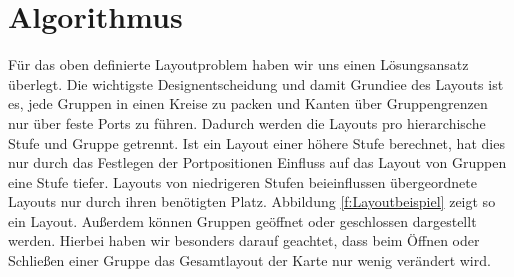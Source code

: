 \chapter{Algorithmus} %



Für das oben definierte Layoutproblem haben wir uns einen Lösungsansatz überlegt.
Die wichtigste Designentscheidung und damit Grundiee des Layouts ist es, jede Gruppen in einen Kreise zu packen und Kanten über Gruppengrenzen nur über feste Ports zu führen.
Dadurch werden die Layouts pro hierarchische Stufe und Gruppe getrennt. 
Ist ein Layout einer höhere Stufe berechnet, hat dies nur durch das Festlegen der Portpositionen Einfluss auf das Layout von Gruppen eine Stufe tiefer.  Layouts von niedrigeren Stufen beieinflussen übergeordnete Layouts nur durch ihren benötigten Platz.
Abbildung \ref{f:Layoutbeispiel} zeigt so ein Layout.
Außerdem können Gruppen geöffnet oder geschlossen dargestellt werden. 
Hierbei haben wir besonders darauf geachtet, dass beim Öffnen oder Schließen einer Gruppe das Gesamtlayout der Karte nur wenig verändert wird.


